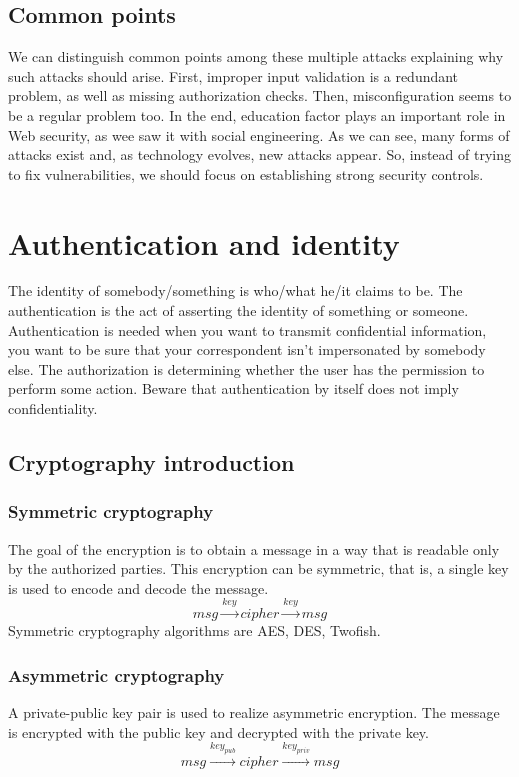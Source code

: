 \subsection{Common points}
We can distinguish common points among these multiple attacks explaining why
such attacks should arise. First, improper input validation is a redundant
problem, as well as missing authorization checks. Then, misconfiguration seems
to be a regular problem too. In the end, education factor plays an important
role in Web security, as wee saw it with social engineering. As we can see, many
forms of attacks exist and, as technology evolves, new attacks appear. So,
instead of trying to fix vulnerabilities, we should focus on establishing strong
security controls.

\section{Authentication and identity}

The identity of somebody/something is who/what he/it claims to be.
The authentication is the act of asserting the identity of something or someone.
Authentication is needed when you want to transmit confidential
information, you want to be sure that your correspondent isn't
impersonated by somebody else.
The authorization is determining whether the user has the permission to perform some action.
Beware that authentication by itself does not imply confidentiality.

\subsection{Cryptography introduction}

\subsubsection{Symmetric cryptography}
The goal of the encryption is to obtain a message in a way that is readable
only by the authorized parties.
This encryption can be symmetric, that is, a single key is used to encode and
decode the message.
\[ msg \xrightarrow{key} cipher \xrightarrow{key} msg \]
Symmetric cryptography algorithms are AES, DES, Twofish.

\subsubsection{Asymmetric cryptography}
A private-public key pair is used to realize asymmetric encryption. The
message is encrypted with the public key and decrypted with the private key.
\[ msg \xrightarrow{key_{pub}} cipher \xrightarrow{key_{priv}} msg \]

